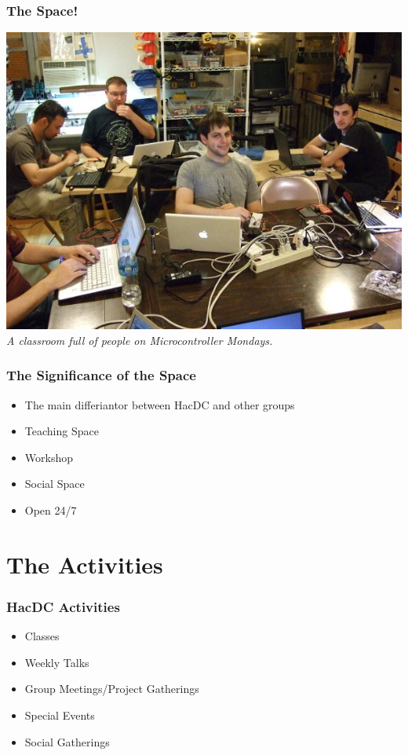 \documentclass[notes]{beamer}
\begin{document}
\begin{frame}[fragile]
  \frametitle{The Space!}
  \begin{center}
    \includegraphics[width=.8\textwidth,height=.8\textheight]{dscf2730_small.jpg} \\
    {\em A classroom full of people on Microcontroller Mondays.}
  \end{center}
\end{frame}

\begin{frame}
  \frametitle{The Significance of the Space}
  \begin{itemize}
  \item The main differiantor between HacDC and other groups
  \item Teaching Space
  \item Workshop
  \item Social Space
  \item Open 24/7
  \end{itemize}
\end{frame}

\section{The Activities}

\begin{frame}
  \frametitle{HacDC Activities}
  \begin{itemize}
  \item Classes
  \item Weekly Talks
  \item Group Meetings/Project Gatherings
  \item Special Events
   \item Social Gatherings
   \end{itemize}
\end{frame}
\end{document}
